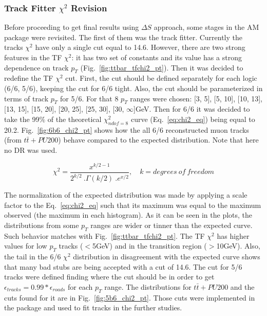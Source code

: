 \subsubsection{Track Fitter $\chi^{2}$ Revision}
Before proceeding to get final results using $\Delta S$ approach, some stages in the AM package were revisited. The first of them was the track fitter. Currently the tracks $\chi^{2}$ have only a single cut equal to 14.6. However, there are two strong features in the TF $\chi^{2}$: it has two set of constants and its value has a strong dependence on track $p_{T}$ (Fig.~\ref{fig:ttbar_tfchi2_pt}). Then it was decided to redefine the TF $\chi^{2}$ cut. First, the cut should be defined separately for each logic (6/6, 5/6), keeping the cut for 6/6 tight. Also, the cut should be parameterized in terms of track $p_{T}$ for 5/6. For that 8 $p_{T}$ ranges were chosen: [3, 5], [5, 10], [10, 13], [13, 15], [15, 20], [20, 25], [25, 30], [30, $\infty$]GeV.  Then for 6/6 it was decided to take the 99$\%$ of the theoretical $\chi^{2}_{ndof=8}$ curve (Eq.~\ref{eq:chi2_eq}) being equal to 20.2. Fig.~\ref{fig:6b6_chi2_pt} shows how the all 6/6 reconstructed muon tracks (from $t\bar{t}+PU200$) behave compared to the expected distribution. Note that here no DR was used.

\begin{equation}
\label{eq:chi2_eq}
\chi^{2} = \frac{x^{k/2 - 1}}{2^{k/2}~.\Gamma(k/2)~.e^{x/2}},\quad k = degrees~of~freedom
\end{equation}

The normalization of the expected distribution was made by applying a scale factor to the Eq.~\ref{eq:chi2_eq} such that its maximum was equal to the maximum observed (the maximum in each histogram). As it can be seen in the plots, the distributions from some $p_{T}$ ranges are wider or tinner than the expected curve. Such behavior matches with Fig.~\ref{fig:ttbar_tfchi2_pt}. The TF $\chi^{2}$ has higher values for low $p_{T}$ tracks ($<$5GeV) and in the transition region ($>$10GeV). Also, the tail in the 6/6 $\chi^{2}$ distribution in disagreement with the expected curve shows that many bad stubs are being accepted with a cut of 14.6. 
The cut for 5/6 tracks were defined finding where the cut should be in order to get $\epsilon_{tracks} = 0.99*\epsilon_{roads}$ for each $p_{T}$ range. The distributions for $t\bar{t}+PU200$ and the cuts found for it are in Fig.~\ref{fig:5b6_chi2_pt}. Those cuts were implemented in the package and used to fit tracks in the further studies.

